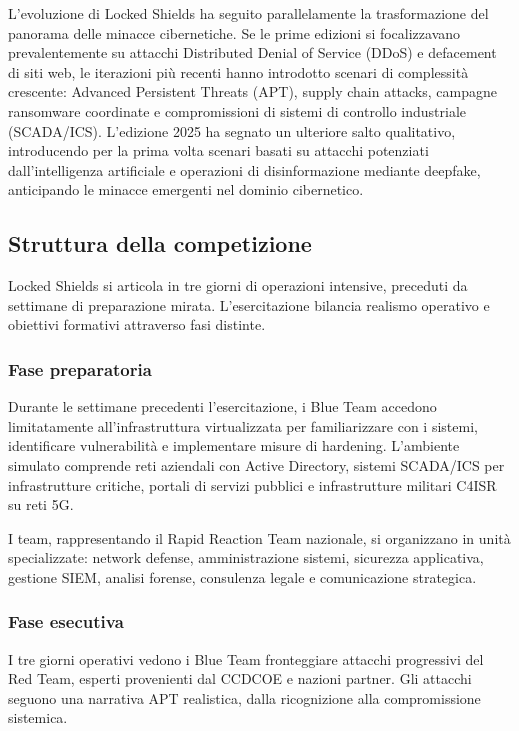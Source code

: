L'evoluzione di Locked Shields ha seguito parallelamente la trasformazione del panorama delle minacce cibernetiche. Se le prime edizioni si focalizzavano prevalentemente su attacchi Distributed Denial of Service (DDoS) e defacement di siti web, le iterazioni più recenti hanno introdotto scenari di complessità crescente: Advanced Persistent Threats (APT), supply chain attacks, campagne ransomware coordinate e compromissioni di sistemi di controllo industriale (SCADA/ICS). L'edizione 2025 ha segnato un ulteriore salto qualitativo, introducendo per la prima volta scenari basati su attacchi potenziati dall'intelligenza artificiale e operazioni di disinformazione mediante deepfake, anticipando le minacce emergenti nel dominio cibernetico.

\subsection{Struttura della competizione}

Locked Shields si articola in tre giorni di operazioni intensive, preceduti da settimane di preparazione mirata. L'esercitazione bilancia realismo operativo e obiettivi formativi attraverso fasi distinte.

\subsubsection{Fase preparatoria}
Durante le settimane precedenti l'esercitazione, i Blue Team accedono limitatamente all'infrastruttura virtualizzata per familiarizzare con i sistemi, identificare vulnerabilità e implementare misure di hardening. L'ambiente simulato comprende reti aziendali con Active Directory, sistemi SCADA/ICS per infrastrutture critiche, portali di servizi pubblici e infrastrutture militari C4ISR su reti 5G.

I team, rappresentando il Rapid Reaction Team nazionale, si organizzano in unità specializzate: network defense, amministrazione sistemi, sicurezza applicativa, gestione SIEM, analisi forense, consulenza legale e comunicazione strategica.

\subsubsection{Fase esecutiva}
I tre giorni operativi vedono i Blue Team fronteggiare attacchi progressivi del Red Team, esperti provenienti dal CCDCOE e nazioni partner. Gli attacchi seguono una narrativa APT realistica, dalla ricognizione alla compromissione sistemica.

